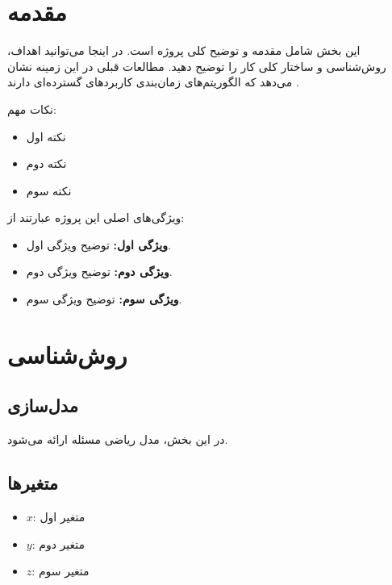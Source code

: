 % 

\section{مقدمه}
این بخش شامل مقدمه و توضیح کلی پروژه است. در اینجا می‌توانید اهداف، روش‌شناسی و ساختار کلی کار را توضیح دهید. مطالعات قبلی در این زمینه نشان می‌دهد که الگوریتم‌های زمان‌بندی کاربردهای گسترده‌ای دارند \cite{ref-1}.

\noindent
نکات مهم:
\begin{itemize}
    \item نکته اول
    \item نکته دوم
    \item نکته سوم
\end{itemize}

\noindent
ویژگی‌های اصلی این پروژه عبارتند از:
\begin{itemize}
    \item \textbf{ویژگی اول:} توضیح ویژگی اول.
    \item \textbf{ویژگی دوم:} توضیح ویژگی دوم.
    \item \textbf{ویژگی سوم:} توضیح ویژگی سوم.
\end{itemize}

\newpage

\section{روش‌شناسی}

\subsection{مدل‌سازی}
در این بخش، مدل ریاضی مسئله ارائه می‌شود.

\subsection*{متغیرها}
\begin{itemize}
    \item $ x $: متغیر اول
    \item $ y $: متغیر دوم
    \item $ z $: متغیر سوم
\end{itemize}

